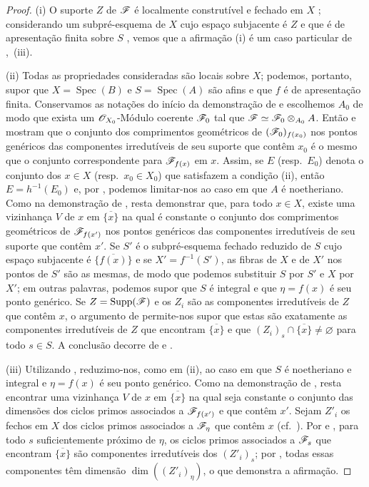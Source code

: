 \begin{proof}
\label{IV.9.9.2-proof}
(i) O suporte $Z$ de $\mathscr{F}$ é localmente construtível e fechado em $X$ ; considerando um subpré-esquema de $X$ cujo espaço subjacente é $Z$ e que é de apresentação finita sobre $S$ , vemos que a afirmação (i) é um caso particular de ,~(iii).

(ii) Todas as propriedades consideradas são locais sobre $X$; podemos, portanto, supor que $X=\operatorname{Spec}(B)$ e $S=\operatorname{Spec}(A)$ são afins e que $f$ é de apresentação finita.
Conservamos as notações do início da demonstração de  e escolhemos $A_0$ de modo que exista um $\mathscr{O}_{X_0}$-Módulo coerente $\mathscr{F}_0$ tal que $\mathscr{F}\simeq\mathscr{F}_0\otimes_{A_0}A$.
Então  e  mostram que o conjunto dos comprimentos geométricos de $(\mathscr{F}_0)_{f(x_0)}$ nos pontos genéricos das componentes irredutíveis de seu suporte que contêm $x_0$ é o mesmo que o conjunto correspondente para $\mathscr{F}_{f(x)}$ em $x$.
Assim, se $E$ (resp.~$E_0$) denota o conjunto dos $x\in X$ (resp.~$x_0\in X_0$) que satisfazem a condição (ii), então $E=h^{-1}(E_0)$ e, por , podemos limitar-nos ao caso em que $A$ é noetheriano.
Como na demonstração de , resta demonstrar que, para todo $x\in X$, existe uma vizinhança $V$ de $x$ em $\overline{\{x\}}$ na qual é constante o conjunto dos comprimentos geométricos de $\mathscr{F}_{f(x')}$ nos pontos genéricos das componentes irredutíveis de seu suporte que contêm $x'$.
Se $S'$ é o subpré-esquema fechado reduzido de $S$ cujo espaço subjacente é $\overline{\{f(x)\}}$ e se $X'=f^{-1}(S')$, as fibras de $X$ e de $X'$ nos pontos de $S'$ são as mesmas,
de modo que podemos substituir $S$ por $S'$ e $X$ por $X'$; em outras palavras, podemos supor que $S$ é integral e que $\eta=f(x)$ é seu ponto genérico.
Se $Z=\operatorname{Supp}(\mathscr{F})$ e os $Z_i$ são as componentes irredutíveis de $Z$ que contêm $x$, o argumento de  permite-nos supor que estas são exatamente as componentes irredutíveis de $Z$ que encontram $\overline{\{x\}}$ e que $(Z_i)_s\cap\overline{\{x\}}\neq\varnothing$ para todo $s\in S$.
A conclusão decorre de  e .

(iii) Utilizando , reduzimo-nos, como em (ii), ao caso em que $S$ é noetheriano e integral e $\eta=f(x)$ é seu ponto genérico.
Como na demonstração de , resta encontrar uma vizinhança $V$ de $x$ em $\overline{\{x\}}$ na qual seja constante o conjunto das dimensões dos ciclos primos associados a $\mathscr{F}_{f(x')}$ e que contêm $x'$.
Sejam $Z'_i$ os fechos em $X$ dos ciclos primos associados a $\mathscr{F}_\eta$ que contêm $x$ (cf.~).
Por  e , para todo $s$ suficientemente próximo de $\eta$, os ciclos primos associados a $\mathscr{F}_s$ que encontram $\overline{\{x\}}$ são componentes irredutíveis dos $(Z'_i)_s$; por , todas essas componentes têm dimensão $\dim((Z'_i)_\eta)$, o que demonstra a afirmação.


\end{proof}
